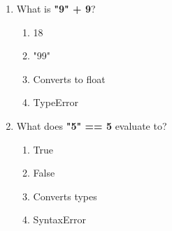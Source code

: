 \documentclass{article}
\begin{document}
\begin{multicols*}{4}
\begin{enumerate}
        \item What is \textbf{"9" + 9}?
        \begin{enumerate}[label=(\Alph*)]
            \item 18
            \item "99"
            \item Converts to float
            \item TypeError
        \end{enumerate}

        \item What does \textbf{"5" == 5} evaluate to?
        \begin{enumerate}[label=(\Alph*)]
            \item True
            \item False
            \item Converts types
            \item SyntaxError
        \end{enumerate}
    \end{enumerate}

\end{multicols*}
\end{document}
